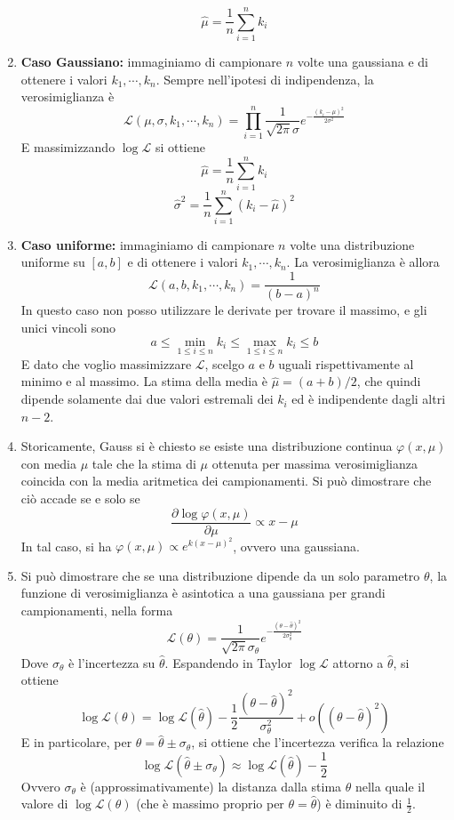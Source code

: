 \documentclass[a4paper,11pt]{article}
\begin{document}
\begin{enumerate}[resume]
	\[\hat{\mu}=\frac{1}{n}\sum_{i=1}^{n}k_i\]
	\item\textbf{Caso Gaussiano:} immaginiamo di campionare $n$ volte una gaussiana e di ottenere i valori $k_1,\cdots,k_n$. Sempre nell'ipotesi di indipendenza, la verosimiglianza è
	\[\mathcal{L}(\mu,\sigma,k_1,\cdots,k_n)=\prod_{i=1}^{n}\frac{1}{\sqrt{2\pi}\sigma}e^{-\frac{(k_i-\mu)^2}{2\sigma^2}}\]
	E massimizzando $\log\mathcal{L}$ si ottiene
	\[\hat{\mu}=\frac{1}{n}\sum_{i=1}^{n}k_i\]
	\[\hat{\sigma}^2=\frac{1}{n}\sum_{i=1}^{n}(k_i-\hat{\mu})^2\]
	\item\textbf{Caso uniforme:} immaginiamo di campionare $n$ volte una distribuzione uniforme su $[a,b]$ e di ottenere i valori $k_1,\cdots,k_n$. La verosimiglianza è allora
	\[\mathcal{L}(a,b,k_1,\cdots,k_n)=\frac{1}{(b-a)^n}\]
	In questo caso non posso utilizzare le derivate per trovare il massimo, e gli unici vincoli sono 
	\[a\leq\min_{1\leq i\leq n} k_i\leq \max_{1\leq i\leq n}k_i\leq b\]
	E dato che voglio massimizzare $\mathcal{L}$, scelgo $a$ e $b$ uguali rispettivamente al minimo e al massimo. La stima della media è $\hat{\mu}=(a+b)/2$, che quindi dipende solamente dai due valori estremali dei $k_i$ ed è indipendente dagli altri $n-2$.
	\item Storicamente, Gauss si è chiesto se esiste una distribuzione continua $\varphi(x,\mu)$ con media $\mu$ tale che la stima di $\mu$ ottenuta per massima verosimiglianza coincida con la media aritmetica dei campionamenti. Si può dimostrare che ciò accade se e solo se
	\[\frac{\partial\log\varphi(x,\mu)}{\partial \mu}\propto x-\mu\]
	In tal caso, si ha $\varphi(x,\mu)\propto e^{k(x-\mu)^2}$, ovvero una gaussiana.
	\item Si può dimostrare che se una distribuzione dipende da un solo parametro $\theta$, la funzione di verosimiglianza è asintotica a una gaussiana per grandi campionamenti, nella forma
	\[\mathcal{L}(\theta)=\frac{1}{\sqrt{2\pi}\sigma_\theta}e^{-\frac{(\theta-\hat{\theta})^2}{2\sigma_\theta^2}}\]
	Dove $\sigma_\theta$ è l'incertezza su $\hat{\theta}$. Espandendo in Taylor $\log \mathcal{L}$ attorno a $\hat{\theta}$, si ottiene
	\[\log\mathcal{L}(\theta)=\log\mathcal{L}(\hat{\theta})-\frac{1}{2}\frac{(\theta-\hat{\theta})^2}{\sigma_\theta^2}+o\left((\theta-\hat{\theta})^2\right)\]
	E in particolare, per $\theta=\hat{\theta}\pm\sigma_\theta$, si ottiene che l'incertezza verifica la relazione
	\[\log\mathcal{L}(\hat{\theta}\pm\sigma_\theta)\approx\log\mathcal{L}(\hat{\theta})-\frac{1}{2}\]
	Ovvero $\sigma_\theta$ è (approssimativamente) la distanza dalla stima $\theta$ nella quale il valore di $\log\mathcal{L}(\theta)$ (che è massimo proprio per $\theta=\hat{\theta}$) è diminuito di $\frac{1}{2}$.

\end{enumerate}
\end{document}
